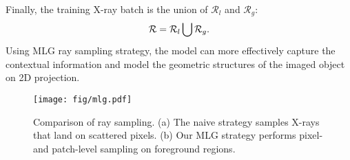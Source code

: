 \documentclass[10pt,twocolumn,letterpaper]{article}
\begin{document}
Finally, the training X-ray batch is the union of $\mathcal{R}_l$ and $\mathcal{R}_g$:
\vspace{-2.3mm}
\begin{equation}
\small
\mathcal{R} = \mathcal{R}_l \bigcup \mathcal{R}_g.
\vspace{1.3mm}
\end{equation}
Using MLG ray sampling strategy, the model can more effectively capture the contextual information and model the geometric structures of the imaged object on 2D projection.

\begin{figure}[t]
	\centering
	\hspace{-2.6mm}
	\texttt{[image: fig/mlg.pdf]} \vspace{-2mm}
	\caption{Comparison of ray sampling. (a) The naive strategy samples X-rays that land on scattered pixels. (b) Our MLG strategy performs pixel- and patch-level sampling on foreground regions. }
	\vspace{-2mm}
	\label{fig:mlg}
\end{figure}
\end{document}
